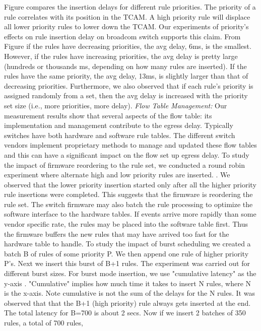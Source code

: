 Figure  compares the insertion delays for different rule priorities. 
The priority of a rule correlates with its position in the TCAM. A high priority rule will displace all lower priority rules to lower down the TCAM. 
Our experiments of priority's effects on rule insertion delay on broadcom switch supports this claim. 
From Figure if the rules have decreasing priorities, the avg delay, 6ms, is the smallest. 
However, if the rules have increasing priorities, the avg delay is pretty large (hundreds or thousands ms, depending on how many rules are inserted). 
If the rules have the same priority, the avg delay, 13ms, is slightly larger than that of decreasing priorities. 
Furthermore, we also observed that if each rule's priority is assigned randomly from a set, then the avg delay is increased with the priority set size (i.e., more priorities, more delay).
\emph{Flow Table Management:}  Our measurement results show that several aspects of the flow table: its implementation and management contribute to the egress delay. 
Typically switches have both hardware and software rule tables. The different switch vendors implement proprietary methods to manage and updated these flow tables and 
this can have a significant impact on the flow set up egress delay. 
To study the impact of firmware reordering to the rule set, we conducted a round robin experiment where alternate high and low priority rules are inserted. 
.  
We observed that the lower priority insertion started only after all the higher priority rule insertions were completed. 
This suggests that the firmware is reordering the rule set. 
The switch firmware may also batch the rule processing to optimize the software interface to the hardware tables. 
If \flowmod events arrive more rapidly than some vendor specific rate, the rules may be placed into the software table first. 
Thus the firmware buffers the new rules that may have arrived too fast for the hardware table to handle. 
To study the impact of burst scheduling we created a batch B of rules of some priority P. We then append one rule of higher priority P's. 
Next we insert this burst of B+1 rules. The experiment was carried out for different burst sizes. 
For burst mode insertion, we use "cumulative latency" as the y-axis . "Cumulative" implies how much time it takes to insert N rules, 
where N is the x-axis. Note cumulative is not the sum of the delays for the N rules.
It was observed that that the B+1 (high priority) rule always gets inserted at the end. The total latency for B=700 is about 2 secs. Now if we insert 2 batches of 350 rules, a total of 700 rules, 
